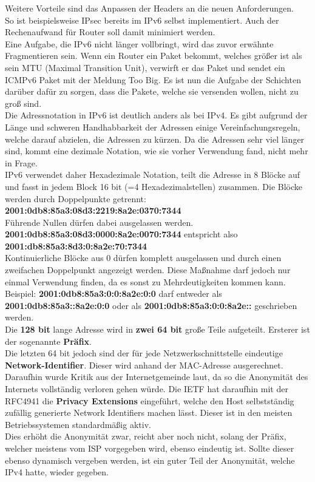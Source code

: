 \documentclass[12pt,a4paper]{report}
\begin{document}
Weitere Vorteile sind das Anpassen der Headers an die neuen Anforderungen.\\
So ist beispielsweise IPsec bereits im IPv6 selbst implementiert. Auch der Rechenaufwand für Router soll damit minimiert werden.\\

Eine Aufgabe, die IPv6 nicht länger vollbringt, wird das zuvor erwähnte Fragmentieren sein. Wenn ein Router ein Paket bekommt, welches größer ist als sein MTU (Maximal Transition Unit), verwirft er das Paket und sendet ein ICMPv6 Paket mit der Meldung \glqq Too Big\grqq . Es ist nun die Aufgabe der Schichten darüber dafür zu sorgen, dass die Pakete, welche sie versenden wollen, nicht zu groß sind.\\

Die Adressnotation in IPv6 ist deutlich anders als bei IPv4. Es gibt aufgrund der Länge und schweren Handhabbarkeit der Adressen einige Vereinfachungsregeln, welche darauf abzielen, die Adressen zu kürzen. Da die Adressen sehr viel länger sind, kommt eine dezimale Notation, wie sie vorher Verwendung fand, nicht mehr in Frage.\\
IPv6 verwendet daher Hexadezimale Notation, teilt die Adresse in 8 Blöcke auf und fasst in jedem Block 16 bit (=4 Hexadezimalstellen) zusammen. Die Blöcke werden durch Doppelpunkte getrennt: \textbf{2001:0db8:85a3:08d3:2219:8a2e:0370:7344}\\
Führende Nullen dürfen dabei ausgelassen werden.\\ \textbf{2001:0db8:85a3:08d3:0000:8a2e:0070:7344} entspricht also\\ \textbf{2001:db8:85a3:8d3:0:8a2e:70:7344}\\
Kontinuierliche Blöcke aus 0 dürfen komplett ausgelassen und durch einen zweifachen Doppelpunkt angezeigt werden. Diese Maßnahme darf jedoch nur einmal Verwendung finden, da es sonst zu Mehrdeutigkeiten kommen kann. Beispiel: \textbf{2001:0db8:85a3:0:0:8a2e:0:0} darf entweder als \textbf{2001:0db8:85a3::8a2e:0:0} oder als \textbf{2001:0db8:85a3:0:0:8a2e::} geschrieben werden.\\

Die \textbf{128 bit} lange Adresse wird in \textbf{zwei 64 bit} große Teile aufgeteilt. Ersterer ist der sogenannte \textbf{Präfix}.\\
Die letzten 64 bit jedoch sind der für jede Netzwerkschnittstelle eindeutige \textbf{Network-Identifier}. Dieser wird anhand der MAC-Adresse ausgerechnet.\\
Daraufhin wurde Kritik aus der Internetgemeinde laut, da so die Anonymität des Internets vollständig verloren gehen würde. Die IETF hat daraufhin mit der RFC4941 die \textbf{Privacy Extensions} eingeführt, welche den Host selbstständig zufällig generierte Network Identifiers machen lässt. Dieser ist in den meisten Betriebssystemen standardmäßig aktiv.\\
Dies erhöht die Anonymität zwar, reicht aber noch nicht, solang der Präfix, welcher meistens vom ISP vorgegeben wird, ebenso eindeutig ist. Sollte dieser ebenso dynamisch vergeben werden, ist ein guter Teil der Anonymität, welche IPv4 hatte, wieder gegeben.\\
\end{document}
